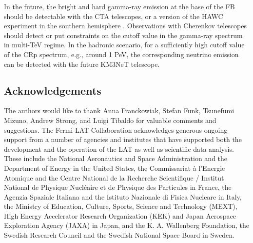 In the future, the bright and hard gamma-ray emission at the base of the FB
should be detectable with the CTA telescopes, or a version of the HAWC experiment in the southern hemisphere 
\citep{2017APS..APR.R4005M, 2017arXiv170909624A}.
Observations with Cherenkov telescopes should detect or put constraints on the cutoff value in the gamma-ray spectrum in multi-TeV regime.
In the hadronic scenario, for a sufficiently high cutoff value of the CRp spectrum, e.g., around 1 PeV,
the corresponding neutrino emission can be detected with the future KM3NeT telescope.


\subsection*{Acknowledgements}

The authors would like to thank Anna Franckowiak, Stefan Funk, Tsunefumi Mizuno, Andrew Strong, and Luigi Tibaldo for valuable comments and suggestions.
The Fermi LAT Collaboration acknowledges generous ongoing support from a number of agencies and institutes that have supported both the development and the operation of the LAT as well as scientific data analysis. These include the National Aeronautics and Space Administration and the Department of Energy in the United States, the Commissariat à l'Energie Atomique and the Centre National de la Recherche Scientifique / Institut National de Physique Nucléaire et de Physique des Particules in France, the Agenzia Spaziale Italiana and the Istituto Nazionale di Fisica Nucleare in Italy, the Ministry of Education, Culture, Sports, Science and Technology (MEXT), High Energy Accelerator Research Organization (KEK) and Japan Aerospace Exploration Agency (JAXA) in Japan, and the K. A. Wallenberg Foundation, the Swedish Research Council and the Swedish National Space Board in Sweden.




